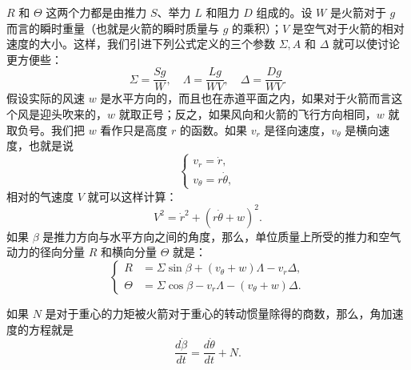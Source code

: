 $R$ 和 $\Theta$ 这两个力都是由推力 $S$、举力 $L$ 和阻力 $D$ 组成的。设 $W$ 是火箭对于 $g$ 而言的瞬时重量（也就是火箭的瞬时质量与 $g$ 的乘积）；$V$ 是空气对于火箭的相对速度的大小。这样，我们引进下列公式定义的三个参数 $\Sigma, A$ 和 $\Delta$ 就可以使讨论更方便些：
\begin{equation}\label{eq:ch13_sigma_lambda_delta}
\Sigma = \frac{Sg}{W},\quad \Lambda = \frac{Lg}{WV}, \quad \Delta = \frac{Dg}{WV}.
\end{equation}
假设实际的风速 $w$ 是水平方向的，而且也在赤道平面之内，如果对于火箭而言这个风是迎头吹来的，$w$ 就取正号；反之，如果风向和火箭的飞行方向相同，$w$ 就取负号。我们把 $w$ 看作只是高度 $r$ 的函数。如果 $v_r$ 是径向速度，$v_\theta$ 是横向速度，也就是说
\begin{equation}\label{eq:ch13_velocities}
\begin{cases}
v_r = \dot{r}, \\
v_\theta = r\dot{\theta},
\end{cases}
\end{equation}
相对的气速度 $V$ 就可以这样计算：
\begin{equation}
\label{eq:ch13_relative_velocity}
V^2 = \dot{r}^2 + (r\dot{\theta} + w)^2.
\end{equation}
如果 $\beta$ 是推力方向与水平方向之间的角度，那么，单位质量上所受的推力和空气动力的径向分量 $R$ 和横向分量 $\Theta$ 就是：
\begin{equation}\label{eq:ch13_R_Theta}
\left\{
\begin{aligned}
R &= \Sigma \sin \beta + (v_\theta + w)\Lambda - v_r\Delta, \\
\Theta &= \Sigma \cos \beta - v_r\Lambda - (v_\theta + w)\Delta.
\end{aligned}
\right.
\end{equation}

如果 $N$ 是对于重心的力矩被火箭对于重心的转动惯量除得的商数，那么，角加速度的方程就是
\begin{equation}\label{eq:ch13_angular_acc}
\frac{d\dot{\beta}}{dt} = \frac{d\dot{\theta}}{dt} + N.
\end{equation}


